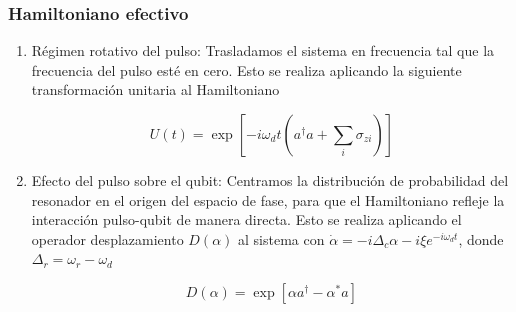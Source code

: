 \documentclass[xetex,mathserif,serif, 8pt]{beamer}
\begin{document}
\begin{frame}
    \frametitle{Hamiltoniano efectivo}

    \begin{enumerate}
        \item Régimen rotativo del pulso: Trasladamos el sistema en frecuencia tal que la frecuencia del pulso esté en cero. Esto se realiza aplicando la siguiente transformación unitaria al Hamiltoniano

            \begin{equation}
                U(t) = \exp[-i \omega_d t(a^\dagger a + \sum\limits_i \sigma_{z i})]
            \end{equation}

        \item Efecto del pulso sobre el qubit: Centramos la distribución de probabilidad del resonador en el origen del espacio de fase, para que el Hamiltoniano refleje la interacción pulso-qubit de manera directa. Esto se realiza aplicando el operador desplazamiento $D(\alpha)$ al sistema con $\dot{\alpha} = -i \Delta_c \alpha -i \xi e^{-i \omega_d t}$, donde $\Delta_r = \omega_r - \omega_d$

            \begin{equation}
                D(\alpha) = \exp[\alpha a^\dagger - \alpha^* a]
            \end{equation}
    \end{enumerate}

\end{frame}
  
\end{document}
